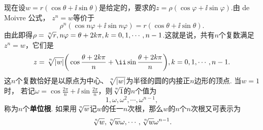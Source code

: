 现在设$w=r(\cos\theta+\ii\sin\theta)$是给定的，要求的$z=\rho(\cos\varphi+\ii\sin\varphi)$.由 de Moivre 公式， $z^n=w$等价于
\[\rho^n(\cos n\varphi+\ii\sin n\varphi)=r(\cos \theta+\ii\sin\theta).\]
由此即得$\rho=\sqrt[\leftroot{-1}\uproot{2} n]r,n\varphi=\theta+2k\pi,k=0,1,\cdots,n-1$.这就是说，共有$n$个复数满足$z^n=w$，它们是
\[z=\sqrt[\leftroot{-1}\uproot{2} n]{|w|}\bigg(\cos\frac{\theta+2k\pi}n+\ii\sin\frac{\theta+2k\pi}n\bigg)
,k=0,1,\cdots,n-1.\]
这$n$个复数恰好是以原点为中心、$\sqrt[\leftroot{-1}\uproot{2} n]{|w|}$为半径的圆的内接正$n$边形的顶点. 当$w=1$时， 若记$\omega=\cos\frac{2\pi}n+\ii\sin\frac{2\pi}n$，则$\sqrt[\leftroot{-1}\uproot{2} n]1$的$n$个值为
\[1,\omega,\omega^2,\cdots,\omega^{n-1},\]
称为$n$个\textbf{单位根}. 如果用$\sqrt[\leftroot{-1}\uproot{2} n]{w}$记$w$的任一$n$次根，那么$w$的$n$个$n$次根又可表示为
\[\sqrt[\leftroot{-1}\uproot{2} n]w,\sqrt[\leftroot{-1}\uproot{2} n]w\omega,\cdots,\sqrt[\leftroot{-1}\uproot{2} n]{w}\omega^{n-1}.\]

